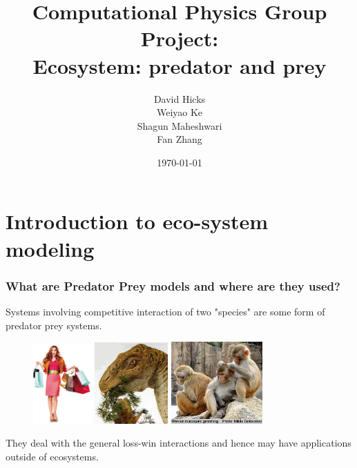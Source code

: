\documentclass{beamer}
\title{Computational Physics Group Project: \\ Ecosystem: predator and prey}
\author{David Hicks\\ Weiyao Ke \\ Shagun Maheshwari \\ Fan Zhang}
\date{\today}
\begin{document}
\frame{\titlepage}

\section[Outline]{}
\frame{\tableofcontents}

\section{Introduction to eco-system modeling}
\frame
{
	\frametitle{What are Predator Prey models and where are they used?}
	
Systems involving competitive interaction of two "species" are some form of predator prey systems. \\
\begin{figure}[H]
  	\centering
      
	\includegraphics[width = 0.2\textwidth]{./pics/resource_consumer.jpeg} 
        \includegraphics[width = 0.25\textwidth]{./pics/Plant_herbivore.jpeg} 
        \includegraphics[width = 0.31\textwidth]{./pics/Parasite_host.jpeg} 
       
        \label{Intro}
  \end{figure}

They deal with the general loss-win interactions and hence may have applications outside of ecosystems. 
}
\end{document}
